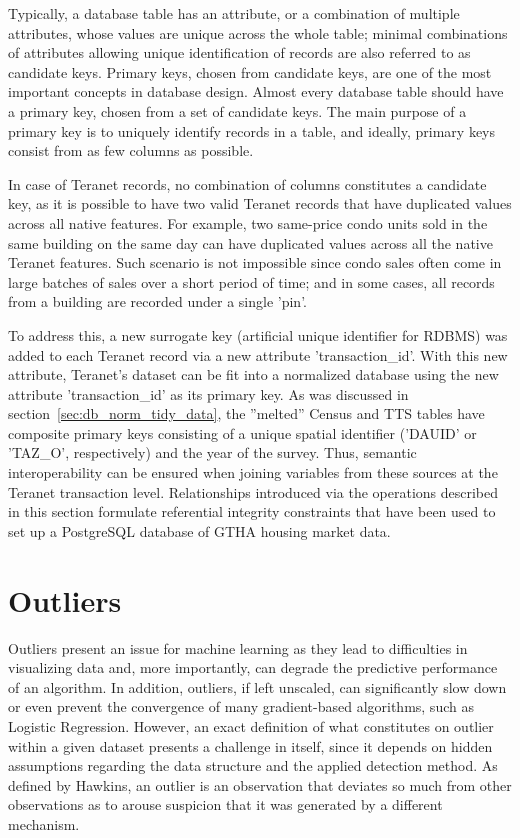 Typically, a database table has an attribute, or a combination of multiple attributes, whose values are unique across the whole table;
minimal combinations of attributes allowing unique identification of records are also referred to as candidate keys.
Primary keys, chosen from candidate keys, are one of the most important concepts in database design.
Almost every database table should have a primary key, chosen from a set of candidate keys.
The main purpose of a primary key is to uniquely identify records in a table, and ideally, primary keys consist from as few columns as possible.

In case of Teranet records, no combination of columns constitutes a candidate key, as it is possible to have two valid Teranet records that have duplicated values across all native features.
For example, two same-price condo units sold in the same building on the same day can have duplicated values across all the native Teranet features.
Such scenario is not impossible since condo sales often come in large batches of sales over a short period of time;
and in some cases, all records from a building are recorded under a single 'pin'.

To address this, a new surrogate key (artificial unique identifier for RDBMS) was added to each Teranet record via a new attribute 'transaction\_id'.
With this new attribute, Teranet's dataset can be fit into a normalized database using the new attribute 'transaction\_id' as its primary key.
As was discussed in section~\ref{sec:db_norm_tidy_data}, the ''melted'' Census and TTS tables have composite primary keys consisting of a unique spatial identifier ('DAUID' or 'TAZ\_O', respectively) and the year of the survey.
Thus, semantic interoperability can be ensured when joining variables from these sources at the Teranet transaction level.
Relationships introduced via the operations described in this section formulate referential integrity constraints that have been used to set up a PostgreSQL database of GTHA housing market data.

\section{Outliers} \label{sec:outliers}

Outliers present an issue for machine learning as they lead to difficulties in visualizing data and, more importantly, can degrade the predictive performance of an algorithm.
In addition, outliers, if left unscaled, can significantly slow down or even prevent the convergence of many gradient-based algorithms, such as Logistic Regression\cite{Scikit-learndevelopers2019b}.
However, an exact definition of what constitutes on outlier within a given dataset presents a challenge in itself, since it depends on hidden assumptions regarding the data structure and the applied detection method\cite{Ben-Gal2005}.
As defined by Hawkins, an outlier is an observation that deviates so much from other observations as to arouse suspicion that it was generated by a different mechanism\cite{Hawkins1980}.

